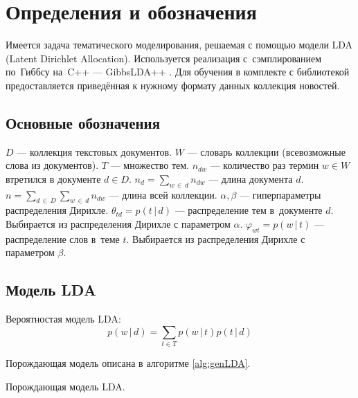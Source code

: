 \documentclass[12pt]{article}
\begin{document}

\section{Определения и обозначения}
Имеется задача тематического моделирования, решаемая с помощью модели LDA (Latent Dirichlet Allocation). 
Используется реализация с~сэмплированием по~Гиббсу на~C++ --- GibbsLDA++ \cite{gibbslda++}. 
Для обучения в комплекте с библиотекой предоставляется приведённая к нужному формату данных коллекция новостей.

\subsection{Основные обозначения}
$ D $ --- коллекция текстовых документов. \newline
$ W $ --- словарь коллекции (всевозможные слова из документов).\newline
$ T $ --- множество тем.\newline
$ n_{dw} $ --- количество раз термин $ w \in W $ втретился в документе $ d \in D $.\newline
$\displaystyle n_d = \sum_{w\,\in\,d}n_{dw} $ --- длина документа $ d $.\newline
$\displaystyle n = \sum_{d\,\in\,D}\sum_{w\,\in\,d}n_{dw} $ --- длина всей коллекции.\newline
$ \alpha, \beta $ --- гиперпараметры распределения Дирихле.\newline
$\displaystyle \theta_{td} = p(t\,|\,d) $ --- распределение тем в~документе $ d $. Выбирается из распределения Дирихле с параметром $ \alpha $.\newline
$\displaystyle \varphi_{wt} = p(w\,|\,t) $ --- распределение слов в~теме $ t $. Выбирается из распределения Дирихле с параметром $ \beta $.

\subsection{Модель LDA}
Вероятностая модель LDA:
\[
  p(w\,|\,d) = \sum_{t \in T}p(w\,|\,t)p(t\,|\,d)
\]

Порождающая модель описана в алгоритме \ref{alg:genLDA}.

\begin{algorithm}
\label{alg:genLDA}
\caption{Порождающая модель LDA.}
\DontPrintSemicolon


\end{algorithm}
\end{document}
